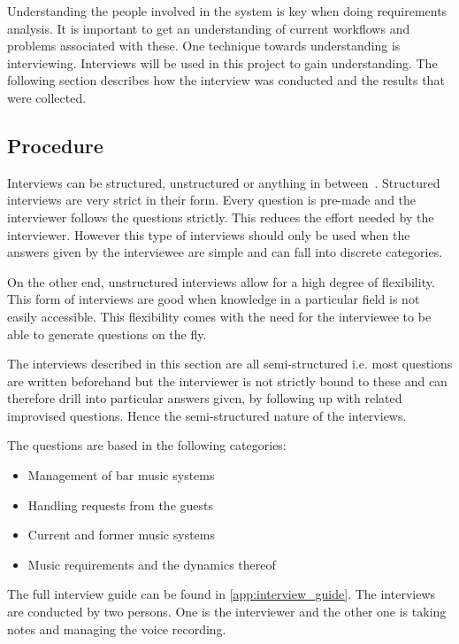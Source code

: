 \label{interviews}

Understanding the people involved in the system is key when doing requirements analysis. It is important to get an understanding of current workflows and problems associated with these. One technique towards understanding is interviewing. Interviews will be used in this project to gain understanding. The following section describes how the interview was conducted and the results that were collected.

\subsection{Procedure}
\label{sub:procedure}

Interviews can be structured, unstructured or anything in between~\cite{benyon2013designing}. Structured interviews are very strict in their form. Every question is pre-made and the interviewer follows the questions strictly. This reduces the effort needed by the interviewer. However this type of interviews should only be used when the answers given by the interviewee are simple and can fall into discrete categories.

On the other end, unstructured interviews allow for a high degree of flexibility. This form of interviews are good when knowledge in a particular field is not easily accessible. This flexibility comes with the need for the interviewee to be able to generate questions on the fly.

The interviews described in this section are all semi-structured i.e. most questions are written beforehand but the interviewer is not strictly bound to these and can therefore drill into particular answers given, by following up with related improvised questions. Hence the semi-structured nature of the interviews.

The questions are based in the following categories:

\begin{itemize}
  \item Management of bar music systems
  \item Handling requests from the guests
  \item Current and former music systems
  \item Music requirements and the dynamics thereof
\end{itemize}

The full interview guide can be found in \cref{app:interview_guide}. The interviews are conducted by two persons. One is the interviewer and the other one is taking notes and managing the voice recording.

